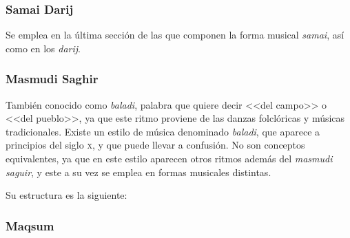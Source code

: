 
\subsubsection{Samai Darij}

Se emplea en la última sección de las que componen la forma musical \emph{samai}, así como en los \emph{darij}.

\begin{center}
\end{center}


\subsubsection{Masmudi Saghir}

También conocido como \emph{baladi}, palabra que quiere decir <<del campo>> o <<del pueblo>>, ya que este ritmo proviene de las danzas folclóricas y músicas tradicionales. Existe un estilo de música denominado \emph{baladi}, que aparece a principios del siglo \textsc{x}, y que puede llevar a confusión. No son conceptos equivalentes, ya que en este estilo aparecen otros ritmos además del \emph{masmudi saguir}, y este a su vez se emplea en formas musicales distintas.

Su estructura es la siguiente:

\begin{center}
\end{center}


\subsubsection{Maqsum}

